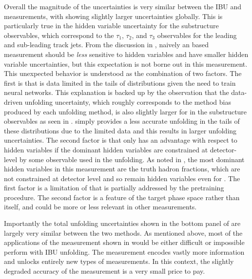 Overall the magnitude of the uncertainties is very similar between the IBU and \Omnifold measurements, with \Omnifold showing slightly larger uncertainties globally.
This is particularly true in the hidden variable uncertainty for the substructure observables, which correspond to the $\tau_1$, $\tau_2$, and $\tau_3$ observables for the leading and sub-leading track jets.
From the discussion in , naively an \Omnifold based measurement should be \textit{less} sensitive to hidden variables and have smaller hidden variable uncertainties, but this expectation is not borne out in this measurement.
This unexpected behavior is understood as the combination of two factors.
The first is that \Omnifold is data limited in the tails of distributions given the need to train neural networks.
This explanation is backed up by the observation that the data-driven unfolding uncertainty, which roughly corresponds to the method bias produced by each unfolding method, is also slightly larger for \Omnifold in the substructure observables as seen in .
\Omnifold simply provides a less accurate unfolding in the tails of these distributions due to the limited data and this results in larger unfolding uncertainties.
The second factor is that \Omnifold only has an advantage with respect to hidden variables if the dominant hidden variables are constrained at detector-level by some observable used in the unfolding.
As noted in , the most dominant hidden variables in this measurement are the truth hadron fractions, which are not constrained at detector level and so remain hidden variables even for \Omnifold.
The first factor is a limitation of \Omnifold that is partially addressed by the pretraining procedure.
The second factor is a feature of the target phase space rather than \Omnifold itself, and could be more or less relevant in other measurements.

Importantly the total unfolding uncertainties shown in the bottom panel of  are largely very similar between the two methods.
As mentioned above, most of the applications of the measurement shown in  would be either difficult or impossible perform with IBU unfolding.
The \Omnifold measurement encodes vastly more information and unlocks entirely new types of measurements.
In this context, the slightly degraded accuracy of the measurement is a very small price to pay.

\FloatBarrier


